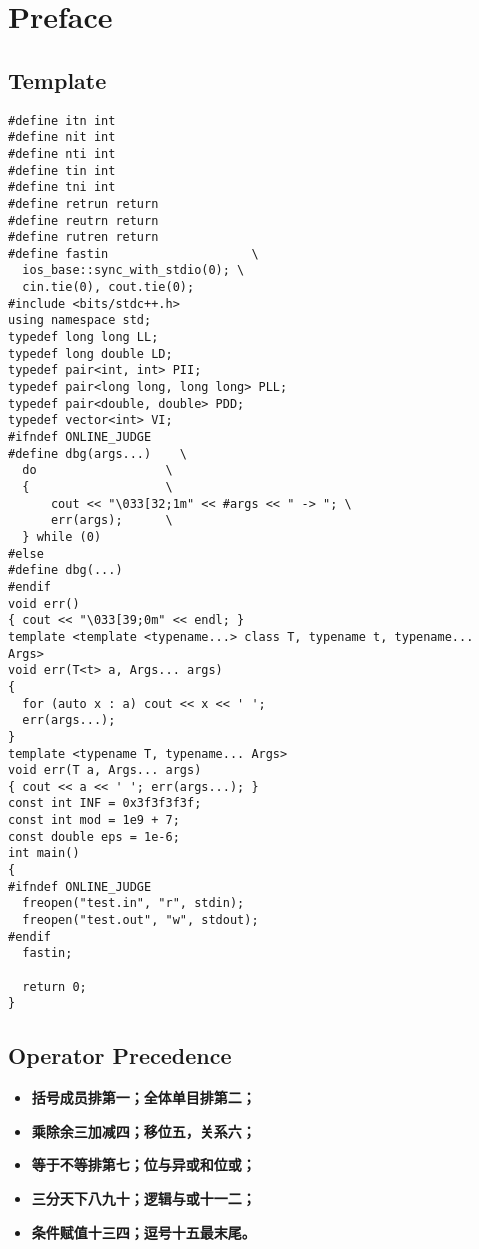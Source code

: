 \chapter{Preface}\label{chap:Template}
\section{Template}
\begin{lstlisting}
#define itn int
#define nit int
#define nti int
#define tin int
#define tni int
#define retrun return
#define reutrn return
#define rutren return
#define fastin                    \
  ios_base::sync_with_stdio(0); \
  cin.tie(0), cout.tie(0);
#include <bits/stdc++.h>
using namespace std;
typedef long long LL;
typedef long double LD;
typedef pair<int, int> PII;
typedef pair<long long, long long> PLL;
typedef pair<double, double> PDD;
typedef vector<int> VI;
#ifndef ONLINE_JUDGE
#define dbg(args...)    \
  do                  \
  {                   \
      cout << "\033[32;1m" << #args << " -> "; \
      err(args);      \
  } while (0)
#else
#define dbg(...)
#endif
void err() 
{ cout << "\033[39;0m" << endl; }
template <template <typename...> class T, typename t, typename... Args>
void err(T<t> a, Args... args)
{
  for (auto x : a) cout << x << ' ';
  err(args...);
}
template <typename T, typename... Args>
void err(T a, Args... args)
{ cout << a << ' '; err(args...); }
const int INF = 0x3f3f3f3f;
const int mod = 1e9 + 7;
const double eps = 1e-6;
int main()
{
#ifndef ONLINE_JUDGE
  freopen("test.in", "r", stdin);
  freopen("test.out", "w", stdout);
#endif
  fastin;

  return 0;
}
\end{lstlisting}

\section{Operator Precedence}
\begin{itemize}
  \item \textbf{括号成员排第一；全体单目排第二；}
  \item \textbf{乘除余三加减四；移位五，关系六；}
  \item \textbf{等于不等排第七；位与异或和位或；}
  \item \textbf{三分天下八九十；逻辑与或十一二；}
  \item \textbf{条件赋值十三四；逗号十五最末尾。}
\end{itemize}

